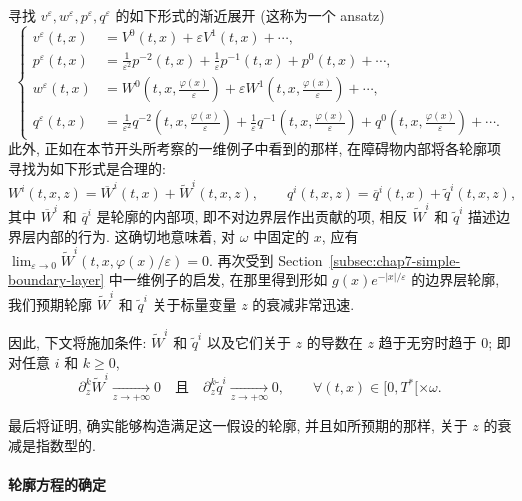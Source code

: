 \begin{sloppypar}
寻找 $v^\varepsilon,w^\varepsilon,p^\varepsilon,q^\varepsilon$ 的如下形式的渐近展开 (这称为一个 ansatz)
\begin{equation}
\left\{
\begin{aligned}
 v^\varepsilon(t,x)&=V^0(t,x)+\varepsilon V^1(t,x)+\cdots,\\
 p^\varepsilon(t,x)&=\frac1{\varepsilon^2}p^{-2}(t,x)+\frac1\varepsilon p^{-1}(t,x)+p^0(t,x)+\cdots,\\
 w^\varepsilon(t,x)&=W^0\left(t,x,\frac{\varphi(x)}\varepsilon\right)
 +\varepsilon W^1\left(t,x,\frac{\varphi(x)}\varepsilon\right)+\cdots,\\
 q^\varepsilon(t,x)&=\frac1{\varepsilon^2}q^{-2}\left(t,x,\frac{\varphi(x)}\varepsilon\right)
 +\frac1\varepsilon q^{-1}\left(t,x,\frac{\varphi(x)}\varepsilon\right)
 +q^0\left(t,x,\frac{\varphi(x)}\varepsilon\right)+\cdots.
\end{aligned}
\right.
\label{eq:chap7-penalty-profile-ansatz}
\end{equation}
此外, 正如在本节开头所考察的一维例子中看到的那样, 在障碍物内部将各轮廓项寻找为如下形式是合理的:
\[
 W^i(t,x,z)=\overline W^i(t,x)+\widetilde W^i(t,x,z),
 \qquad q^i(t,x,z)=\overline q^i(t,x)+\widetilde q^i(t,x,z),
\]
其中 $\overline W^i$ 和 $\overline q^i$ 是轮廓的内部项, 即不对边界层作出贡献的项, 相反 $\widetilde W^i$ 和 $\widetilde q^i$ 描述边界层内部的行为. 这确切地意味着, 对 $\omega$ 中固定的 $x$, 应有 $\lim_{\varepsilon\to0}\widetilde W^i(t,x,\varphi(x)/\varepsilon)=0$. 再次受到 Section~\ref{subsec:chap7-simple-boundary-layer} 中一维例子的启发, 在那里得到形如 $g(x)e^{-|x|/\varepsilon}$ 的边界层轮廓, 我们预期轮廓 $\widetilde W^i$ 和 $\widetilde q^i$ 关于标量变量 $z$ 的衰减非常迅速.

因此, 下文将施加条件: $\widetilde W^i$ 和 $\widetilde q^i$ 以及它们关于 $z$ 的导数在 $z$ 趋于无穷时趋于 $0$; 即对任意 $i$ 和 $k\geq0$,
\begin{equation}
 \partial_z^k\widetilde W^i\underset{z\to+\infty}{\longrightarrow}0
 \quad\text{且}\quad
 \partial_z^k\widetilde q^i\underset{z\to+\infty}{\longrightarrow}0,
 \qquad\forall(t,x)\in[0,T^*[\times\omega.
\label{eq:chap7-profile-decay-condition}
\end{equation}

最后将证明, 确实能够构造满足这一假设的轮廓, 并且如所预期的那样, 关于 $z$ 的衰减是指数型的.

\paragraph{轮廓方程的确定}
\label{subsubsec:chap7-determining-profile-equations}


\end{sloppypar}
